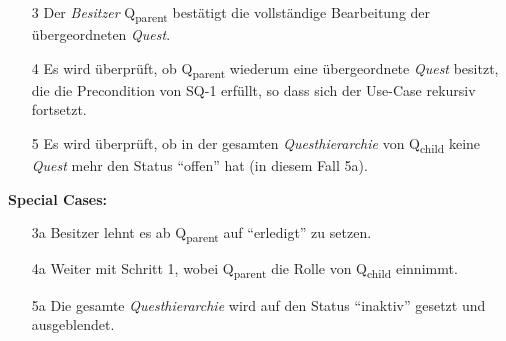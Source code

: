 \documentclass{article}
\begin{document}
\begin{samepage}
\begin{itemize}
    \item[3] Der \textit{Besitzer} Q\textsubscript{parent} bestätigt die vollständige Bearbeitung der übergeordneten \textit{Quest}.
    \item[4] Es wird überprüft, ob Q\textsubscript{parent} wiederum eine übergeordnete \textit{Quest} besitzt, die die Precondition von SQ-1 erfüllt, so dass sich der Use-Case rekursiv fortsetzt. 
    \item[5] Es wird überprüft, ob in der gesamten \textit{Questhierarchie} von Q\textsubscript{child} keine \textit{Quest} mehr den Status ``offen'' hat (in diesem Fall 5a). 
\end{itemize}
\textbf{Special Cases:}
\begin{itemize}
\item [3a] Besitzer lehnt es ab  Q\textsubscript{parent} auf ``erledigt'' zu setzen.
\item [4a] Weiter mit Schritt 1, wobei Q\textsubscript{parent} die Rolle von Q\textsubscript{child} einnimmt. 
\item [5a] Die gesamte \textit{Questhierarchie} wird auf den Status ``inaktiv'' gesetzt und ausgeblendet. 
\end{itemize}
\end{samepage}

\newpage
\end{document}
